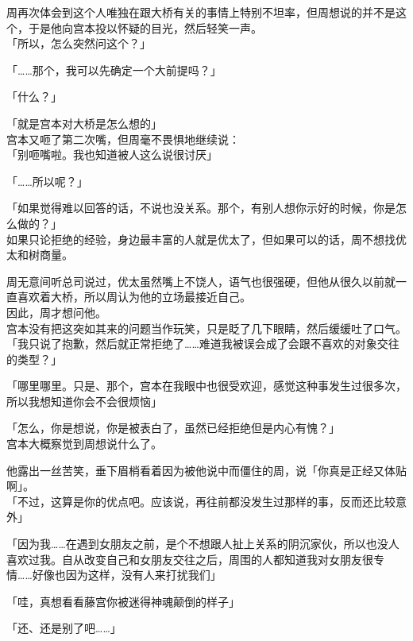 周再次体会到这个人唯独在跟大桥有关的事情上特别不坦率，但周想说的并不是这个，于是他向宫本投以怀疑的目光，然后轻笑一声。\\

「所以，怎么突然问这个？」

「……那个，我可以先确定一个大前提吗？」

「什么？」

「就是宫本对大桥是怎么想的」\\

宫本又咂了第二次嘴，但周毫不畏惧地继续说：\\

「别咂嘴啦。我也知道被人这么说很讨厌」

「……所以呢？」

「如果觉得难以回答的话，不说也没关系。那个，有别人想你示好的时候，你是怎么做的？」\\

如果只论拒绝的经验，身边最丰富的人就是优太了，但如果可以的话，周不想找优太和树商量。

周无意间听总司说过，优太虽然嘴上不饶人，语气也很强硬，但他从很久以前就一直喜欢着大桥，所以周认为他的立场最接近自己。\\

因此，周才想问他。\\

宫本没有把这突如其来的问题当作玩笑，只是眨了几下眼睛，然后缓缓吐了口气。\\

「我只说了抱歉，然后就正常拒绝了……难道我被误会成了会跟不喜欢的对象交往的类型？」

「哪里哪里。只是、那个，宫本在我眼中也很受欢迎，感觉这种事发生过很多次，所以我想知道你会不会很烦恼」

「怎么，你是想说，你是被表白了，虽然已经拒绝但是内心有愧？」\\

宫本大概察觉到周想说什么了。

他露出一丝苦笑，垂下眉梢看着因为被他说中而僵住的周，说「你真是正经又体贴啊」。\\

「不过，这算是你的优点吧。应该说，再往前都没发生过那样的事，反而还比较意外」

「因为我……在遇到女朋友之前，是个不想跟人扯上关系的阴沉家伙，所以也没人喜欢过我。自从改变自己和女朋友交往之后，周围的人都知道我对女朋友很专情……好像也因为这样，没有人来打扰我们」

「哇，真想看看藤宫你被迷得神魂颠倒的样子」

「还、还是别了吧……」

